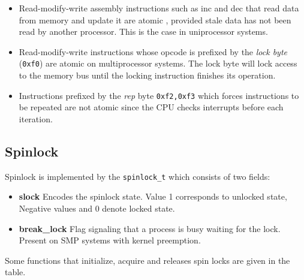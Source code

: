 \documentclass{article}
\begin{document}
\begin{itemize}
  \item Read-modify-write assembly instructions such as inc and dec
    that read data from memory and update it are atomic , provided
    stale data has not been read by another processor. This is the
    case in uniprocessor systems.

  \item Read-modify-write instructions whose opcode is prefixed by the
    \emph{lock byte} (\lstinline{0xf0}) are atomic on multiprocessor
    systems.  The lock byte will lock access to the memory bus until
    the locking instruction finishes its operation.
  \item Instructions prefixed by the \emph{rep} byte \lstinline{0xf2,0xf3}
    which forces instructions to be repeated are not atomic since the
    CPU checks interrupts before each iteration.

\end{itemize}



\subsection{Spinlock}

Spinlock is implemented by the \lstinline{spinlock_t} which consists
of two fields:

\begin{itemize}
  \item \textbf{slock} Encodes the spinlock state. Value 1 corresponds
    to unlocked state, Negative values and 0 denote locked state.
  
  \item \textbf{break\_lock} Flag signaling that a process is busy
    waiting for the lock. Present on SMP systems with kernel
    preemption.    
\end{itemize}

Some functions that initialize, acquire and releases spin locks are
given in the table.
\end{document}
